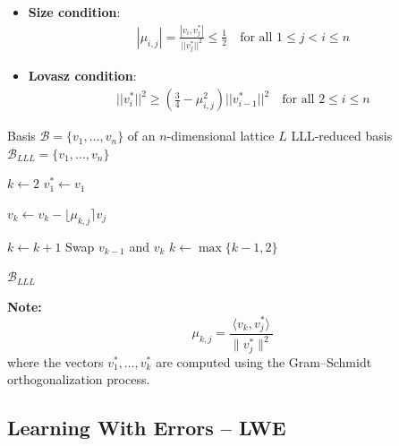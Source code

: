 \begin{itemize}
    \item \textbf{Size condition}:
    \begin{align*}
    |\mu_{i,j}| = \frac{| v_i, v_j^{*} |}{||v_j^{*}||^2} \leq \frac{1}{2} \quad \text{for all } 1 \leq j < i \leq n 
    \end{align*}
    \item \textbf{Lovasz condition}:
    \begin{align*}
    ||v_i^{*}||^2 \geq \left(\frac{3}{4} - \mu_{i, j}^2\right) ||v_{i-1}^{*}||^2 \quad \text{for all } 2 \leq i \leq n
    \end{align*}
\end{itemize}

\begin{algorithm}
\caption{Lenstra--Lenstra--Lovász (LLL) Reduction Algorithm}
\begin{algorithmic}[1]

\Require Basis $\mathcal{B}=\{v_1,\dots,v_n\}$ of an $n$-dimensional lattice $L$
\Ensure LLL-reduced basis $\mathcal{B}_{LLL}=\{v_1,\dots,v_n\}$

\State $k \gets 2$
\State $v_1^* \gets v_1$


        \State $v_k \gets v_k - \lfloor \mu_{k,j} \rceil v_j$
    \EndFor

        \State $k \gets k+1$
    \Else
        \State Swap $v_{k-1}$ and $v_k$
        \State $k \gets \max\{k-1,2\}$
    \EndIf

\EndWhile

\State \Return $\mathcal{B}_{LLL}$

\end{algorithmic}
\end{algorithm}
\noindent
\textbf{Note:}
\[
\mu_{k,j} = \frac{\langle v_k, v_j^* \rangle}{\|v_j^*\|^2}
\]
where the vectors $v_1^*,\dots,v_k^*$ are computed using the Gram--Schmidt orthogonalization process.

\subsection{Learning With Errors -- LWE}

